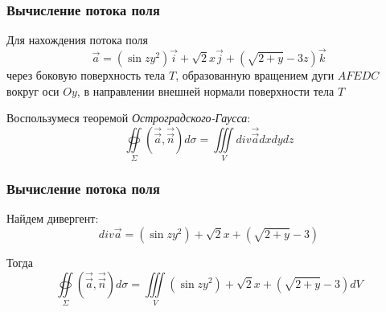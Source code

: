 \begin{frame}\frametitle{Вычисление потока поля}
  Для нахождения потока поля
  \begin{equation*}
		\vec a = (\sin zy^2) \vec i + \sqrt{2} x \vec j + (\sqrt{2+y} -3z) \vec k
	\end{equation*}
		      через боковую поверхность тела \(T\), образованную вращением дуги \(AFEDC\)
		      вокруг оси \(Oy\), в направлении внешней нормали поверхности тела \(T\)
 

  Воспользумеся теоремой \textit{Остроградского-Гаусса}:
  \begin{equation*}
    \oiint\limits_{\Sigma}\left( \overrightarrow{\vec {a}}, \overrightarrow{\vec {n}} \right) d\sigma = \iiint\limits_V div \overrightarrow{\vec {a}} dxdydz 
  \end{equation*}
\end{frame}


\begin{frame}\frametitle{Вычисление потока поля}
  Найдем дивергент:
  \begin{equation*}
    div\vec a = (\sin zy^2) + \sqrt{2} x + (\sqrt{2+y} - 3)
	\end{equation*}
	
  Тогда
  \begin{equation*}
    \oiint\limits_{\Sigma}\left( \overrightarrow{\vec {a}}, \overrightarrow{\vec {n}} \right) d\sigma = \iiint\limits_V (\sin zy^2) + \sqrt{2} x + (\sqrt{2+y} - 3) dV
  \end{equation*}
 
\end{frame}
